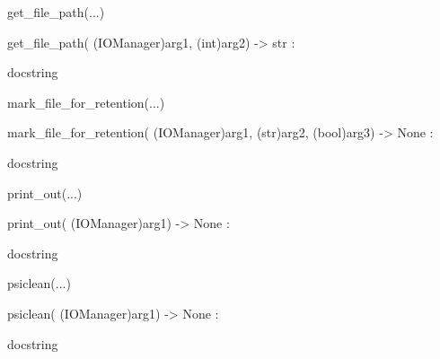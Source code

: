 \documentclass[letterpaper,10pt,english]{sphinxmanual}
\begin{document}
\begin{description}
\begin{description}
\begin{DUlineblock}{0em}
\begin{DUlineblock}{\DUlineblockindent}
\begin{DUlineblock}{\DUlineblockindent}
\item[] 
\end{DUlineblock}
\end{DUlineblock}
\item[] get\_file\_path(...)
\item[]
\begin{DUlineblock}{\DUlineblockindent}
\item[] get\_file\_path( (IOManager)arg1, (int)arg2) -\textgreater{} str :
\item[]
\begin{DUlineblock}{\DUlineblockindent}
\item[] docstring
\item[] 
\end{DUlineblock}
\end{DUlineblock}
\item[] mark\_file\_for\_retention(...)
\item[]
\begin{DUlineblock}{\DUlineblockindent}
\item[] mark\_file\_for\_retention( (IOManager)arg1, (str)arg2, (bool)arg3) -\textgreater{} None :
\item[]
\begin{DUlineblock}{\DUlineblockindent}
\item[] docstring
\item[] 
\end{DUlineblock}
\end{DUlineblock}
\item[] print\_out(...)
\item[]
\begin{DUlineblock}{\DUlineblockindent}
\item[] print\_out( (IOManager)arg1) -\textgreater{} None :
\item[]
\begin{DUlineblock}{\DUlineblockindent}
\item[] docstring
\item[] 
\end{DUlineblock}
\end{DUlineblock}
\item[] psiclean(...)
\item[]
\begin{DUlineblock}{\DUlineblockindent}
\item[] psiclean( (IOManager)arg1) -\textgreater{} None :
\item[]
\begin{DUlineblock}{\DUlineblockindent}
\item[] docstring

\end{DUlineblock}
\end{DUlineblock}
\end{DUlineblock}
\end{description}
\end{description}
\end{document}
